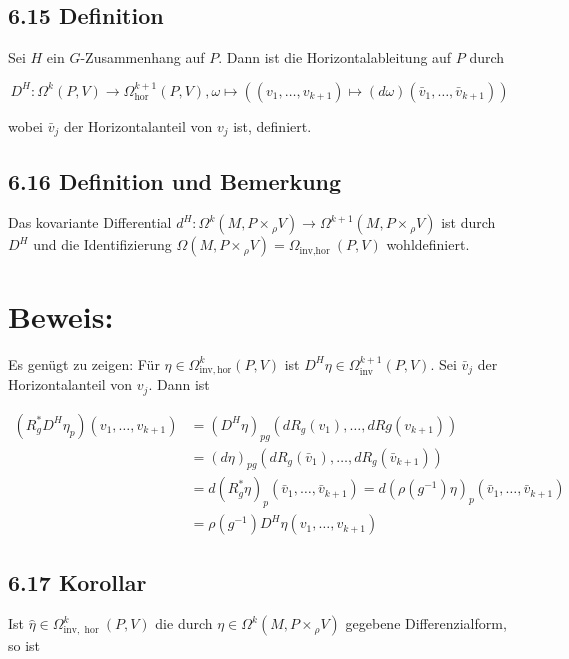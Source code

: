 \subsection*{6.15 Definition}
Sei $H$ ein $G$-Zusammenhang auf $P$. Dann ist die Horizontalableitung auf $P$ durch

$$
D^{H}: \Omega^{k}(P, V) \rightarrow \Omega_{\mathrm{hor}}^{k+1}(P, V), \omega \mapsto\left(\left(v_{1}, \ldots, v_{k+1}\right) \mapsto(d \omega)\left(\bar{v}_{1}, \ldots, \bar{v}_{k+1}\right)\right)
$$

wobei $\bar{v}_{j}$ der Horizontalanteil von $v_{j}$ ist, definiert.

\subsection*{6.16 Definition und Bemerkung}
Das kovariante Differential $d^{H}: \Omega^{k}\left(M, P \times{ }_{\rho} V\right) \rightarrow \Omega^{k+1}\left(M, P \times{ }_{\rho} V\right)$ ist durch $D^{H}$ und die Identifizierung $\Omega\left(M, P \times{ }_{\rho} V\right)=\Omega_{\text {inv,hor }}(P, V)$ wohldefiniert.

\section*{Beweis:}
Es genügt zu zeigen: Für $\eta \in \Omega_{\mathrm{inv}, \mathrm{hor}}^{k}(P, V)$ ist $D^{H} \eta \in \Omega_{\mathrm{inv}}^{k+1}(P, V)$. Sei $\bar{v}_{j}$ der Horizontalanteil von $v_{j}$. Dann ist

$$
\begin{aligned}
\left(R_{g}^{*} D^{H} \eta_{p}\right)\left(v_{1}, \ldots, v_{k+1}\right) & =\left(D^{H} \eta\right)_{p g}\left(d R_{g}\left(v_{1}\right), \ldots, d R g\left(v_{k+1}\right)\right) \\
& =(d \eta)_{p g}\left(d R_{g}\left(\bar{v}_{1}\right), \ldots, d R_{g}\left(\bar{v}_{k+1}\right)\right) \\
& =d\left(R_{g}^{*} \eta\right)_{p}\left(\bar{v}_{1}, \ldots, \bar{v}_{k+1}\right)=d\left(\rho\left(g^{-1}\right) \eta\right)_{p}\left(\bar{v}_{1}, \ldots, \bar{v}_{k+1}\right) \\
& =\rho\left(g^{-1}\right) D^{H} \eta\left(v_{1}, \ldots, v_{k+1}\right)
\end{aligned}
$$

\subsection*{6.17 Korollar}
Ist $\hat{\eta} \in \Omega_{\mathrm{inv}, \text { hor }}^{k}(P, V)$ die durch $\eta \in \Omega^{k}\left(M, P \times{ }_{\rho} V\right)$ gegebene Differenzialform, so ist

